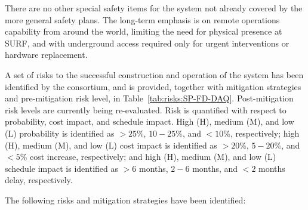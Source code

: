 There are no other special safety items for the  system not already covered by the more general safety plans. The long-term emphasis is on remote operations capability from around the world, limiting the need for physical presence at SURF, and with underground access required only for urgent interventions or hardware replacement. 

A set of risks to the successful construction and operation of the  system has been
identified by the consortium, and is provided,
together with mitigation strategies and pre-mitigation risk level, 
in Table~\ref{tab:risks:SP-FD-DAQ}. Post-mitigation risk levels are
currently being re-evaluated. Risk is quantified with respect to
probability, cost impact, and schedule impact. High (H), medium (M), and low (L)
probability is identified as
$>25$\%, $10-25$\%, and $<10$\%, respectively; high (H), medium (M), and low (L)
cost impact is identified as
$>20$\%, $5-20$\%, and $<5$\% cost increase, respectively; and high
(H), medium (M), and low (L) schedule impact is identified as 
$>6$ months, $2-6$ months, and $<2$ months delay, respectively.




The following risks and mitigation strategies have been identified:


